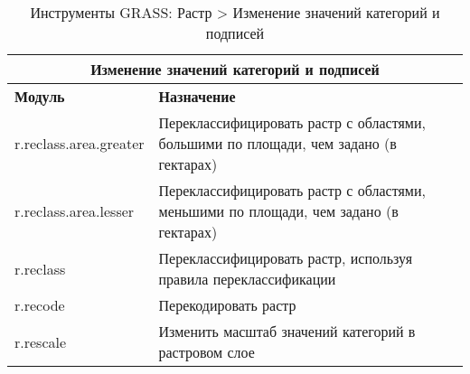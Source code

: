 {\renewcommand{\arraystretch}{0.7}
\begin{table}[H]
\centering
 \begin{tabular}{|p{4cm}|p{11cm}|}
  \hline \multicolumn{2}{|c|}{\textbf{Изменение значений категорий и подписей}} \\
  \hline \textbf{Модуль} & \textbf{Назначение} \\
  \hline r.reclass.area.greater & Переклассифицировать растр с областями,
  большими по площади, чем задано (в гектарах) \\
  \hline r.reclass.area.lesser & Переклассифицировать растр с областями,
  меньшими по площади, чем задано (в гектарах) \\
  \hline r.reclass & Переклассифицировать растр, используя правила
  переклассификации \\
  \hline r.recode & Перекодировать растр \\
  \hline r.rescale & Изменить масштаб значений категорий в растровом слое \\
\hline
\end{tabular}
\caption{Инструменты GRASS: Растр > Изменение значений категорий и подписей}
\end{table}}

